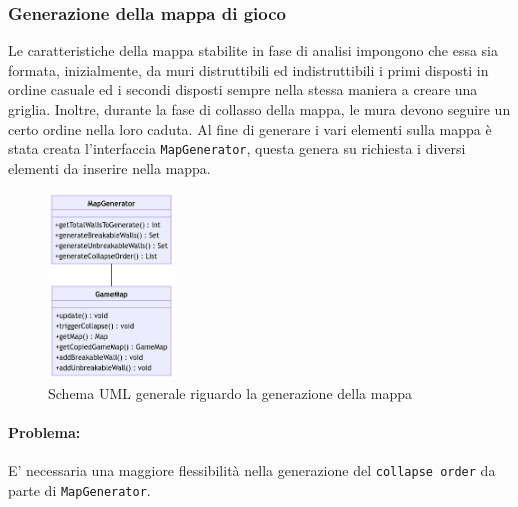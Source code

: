 \documentclass[a4paper,12pt]{report}
\begin{document}
\subsubsection{Generazione della mappa di gioco}\label{map-generator-subsection}
\par
Le caratteristiche della mappa stabilite in fase di analisi impongono che essa sia formata, inizialmente, da muri distruttibili ed indistruttibili i primi disposti in ordine casuale ed i secondi disposti sempre nella stessa maniera a creare una griglia. 
%
Inoltre, durante la fase di collasso della mappa, le mura devono seguire un certo ordine nella loro caduta. 
\newline
Al fine di generare i vari elementi sulla mappa è stata creata l'interfaccia \verb|MapGenerator|, questa genera su richiesta i diversi elementi da inserire nella mappa.
%
\begin{figure}[H]
    \centering{}
    \includegraphics[width=0.3\textwidth]{img/mapgenerator-gamemap.png}
    \caption{Schema UML generale riguardo la generazione della mappa}
    \label{img:mapgenerator-gamemap}
\end{figure}
%
\paragraph{Problema:} E' necessaria una maggiore flessibilità nella generazione del \verb|collapse order| da parte di \verb|MapGenerator|.
%
\end{document}
